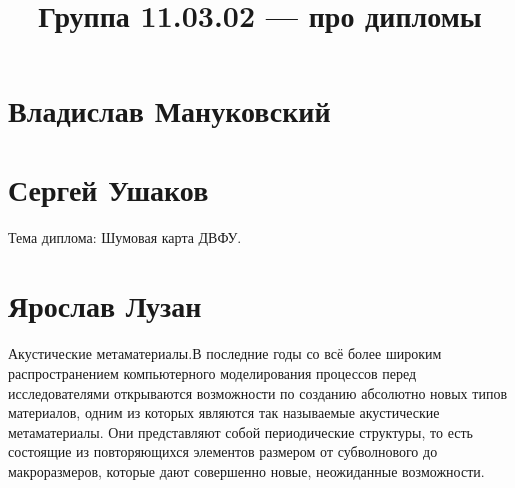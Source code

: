 \documentclass{article}
\title{Группа 11.03.02 --- про дипломы}
\begin{document}
\section*{Владислав Мануковский}

\section*{Сергей Ушаков}

Тема диплома: Шумовая карта ДВФУ.

\section*{Ярослав Лузан}
Акустические метаматериалы.В последние годы со всё более широким распространением компьютерного моделирования процессов перед исследователями открываются возможности по созданию абсолютно новых типов материалов, одним из которых являются так называемые акустические метаматериалы. Они представляют собой периодические структуры, то есть состоящие из повторяющихся элементов размером от субволнового до макроразмеров, которые дают совершенно новые, неожиданные возможности.
\end{document}
